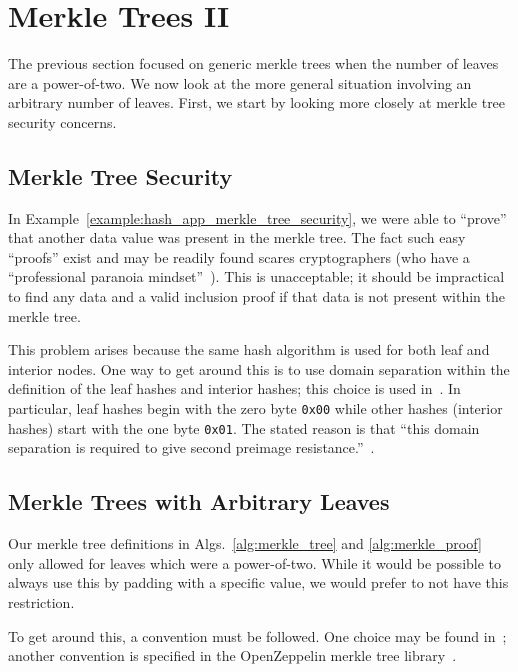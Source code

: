 \section{Merkle Trees II}
\label{sec:merkle_trees_2}

The previous section focused on generic \glspl{merkle tree} when
the number of leaves are a power-of-two.
We now look at the more general situation involving an
arbitrary number of leaves.
First, we start by looking more closely at \gls{merkle tree}
security concerns.

\subsection{Merkle Tree Security}
\label{ssec:mt2_security}

In Example~\ref{example:hash_app_merkle_tree_security},
we were able to ``prove'' that another data value
was present in the \gls{merkle tree}.
The fact such easy ``proofs'' exist and may be readily found
scares cryptographers
(who have a ``professional paranoia mindset''~\cite[Chapter 1.12]{CryptoEng}).
This is unacceptable;
it should be impractical to find any data
and a valid inclusion proof if that data is not present within the
\gls{merkle tree}.

This problem arises because the same hash algorithm is used
for both leaf and interior nodes.
One way to get around this is to use domain separation
within the definition of the leaf hashes and interior hashes;
this choice is used in~\cite{rfc6962,rfc9162}.
In particular, leaf hashes begin with the zero byte \texttt{0x00}
while other hashes (interior hashes) start with the one byte \texttt{0x01}.
The stated reason is that
``this domain separation is required to give
second preimage resistance.''~\cite[Section 2.1.1]{rfc9162}.

\subsection{Merkle Trees with Arbitrary Leaves}

Our \gls{merkle tree} definitions in Algs.~\ref{alg:merkle_tree}
and \ref{alg:merkle_proof} only allowed for leaves
which were a power-of-two.
While it would be possible to always use this
by padding with a specific value,
we would prefer to not have this restriction.

To get around this, a convention must be followed.
One choice may be found in~\cite{rfc6962,rfc9162};
another convention is specified in the OpenZeppelin \gls{merkle tree}
library~\cite{MerkleTreeOZ}.

